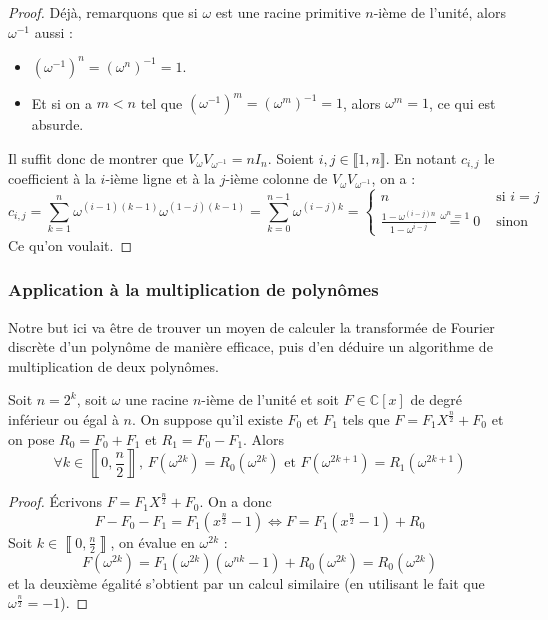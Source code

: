 	\begin{proof}
		Déjà, remarquons que si $\omega$ est une racine primitive $n$-ième de l'unité, alors $\omega^{-1}$ aussi :
		\begin{itemize}
			\item $(\omega^{-1})^n = (\omega^n)^{-1} = 1$.
			\item Et si on a $m < n$ tel que $(\omega^{-1})^m = (\omega^m)^{-1} = 1$, alors $\omega^m = 1$, ce qui est absurde.
		\end{itemize}
		Il suffit donc de montrer que $V_\omega V_{\omega^{-1}} = n I_n$. Soient $i, j \in \llbracket 1, n \rrbracket$. En notant $c_{i,j}$ le coefficient à la $i$-ième ligne et à la $j$-ième colonne de $V_\omega V_{\omega^{-1}}$, on a :
		\[
		c_{i,j}
		= \sum_{k=1}^n \omega^{(i-1)(k-1)} \omega^{(1-j)(k-1)}
		= \sum_{k=0}^{n-1} \omega^{(i-j)k}
		= \begin{cases}
			n &\text{ si } i = j \\
			\frac{1 - \omega^{(i-j)n}}{1 - \omega^{i-j}} \overset{\omega^n = 1}{=} 0 &\text{ sinon}
		\end{cases}
		\]
		Ce qu'on voulait.
	\end{proof}
	
	\subsubsection{Application à la multiplication de polynômes}
	
	Notre but ici va être de trouver un moyen de calculer la transformée de Fourier discrète d'un polynôme de manière efficace, puis d'en déduire un algorithme de multiplication de deux polynômes.
	
	\begin{proposition}
		\label{transformee-de-fourier-discrete-4}
		Soit $n = 2^k$, soit $\omega$ une racine $n$-ième de l'unité et soit $F \in \mathbb{C}[x]$ de degré inférieur ou égal à $n$. On suppose qu'il existe $F_0$ et $F_1$ tels que $F = F_1 X^{\frac{n}{2}} + F_0$ et on pose $R_0 = F_0 + F_1$ et $R_1 = F_0 - F_1$. Alors
		\[ \forall k \in \left\llbracket 0, \frac{n}{2} \right\rrbracket, \, F(\omega^{2k}) = R_0(\omega^{2k}) \text{ et } F(\omega^{2k+1}) = R_1(\omega^{2k+1}) \]
	\end{proposition}
	
	\begin{proof}
		Écrivons $F = F_1 X^{\frac{n}{2}} + F_0$. On a donc
		\[ F - F_0 - F_1 = F_1(x^{\frac{n}{2}} - 1) \iff F = F_1(x^{\frac{n}{2}} - 1) + R_0 \]
		Soit $ k \in \left\llbracket 0, \frac{n}{2} \right\rrbracket$, on évalue en $\omega^{2k}$ :
		\[ F(\omega^{2k}) = F_1(\omega^{2k})(\omega^{nk} - 1) + R_0(\omega^{2k}) = R_0(\omega^{2k}) \]
		et la deuxième égalité s'obtient par un calcul similaire (en utilisant le fait que $\omega^{\frac{n}{2}} = -1$).
	\end{proof}
	
